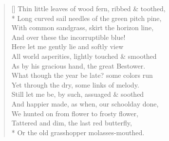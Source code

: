\documentclass[MAIN]{subfiles}
\begin{document}
\settowidth{\versewidth}{Thin little leaves of wood fern, ribbed \& toothed,}
\begin{verse}[\versewidth]
Thin little leaves of wood fern, ribbed \& toothed,\\*
Long curved sail needles of the green pitch pine,\\
With common sandgrass, skirt the horizon line,\\
And over these the incorruptible blue!\\
Here let me gently lie and softly view\\
All world asperities, lightly touched \& smoothed\\
As by his gracious hand, the great Bestower.\\
What though the year be late? some colors run\\
Yet through the dry, some links of melody.\\
Still let me be, by such, assuaged \& soothed\\
And happier made, as when, our schoolday done,\\
We hunted on from flower to frosty flower,\\
Tattered and dim, the last red butterfly,\\*
Or the old grasshopper molasses-mouthed.
\end{verse}
\end{document}
